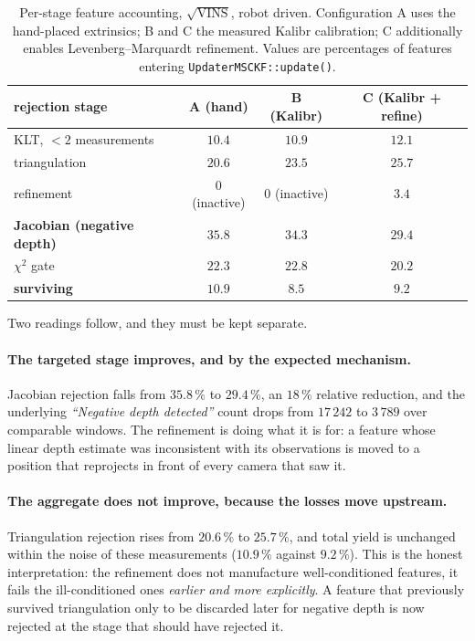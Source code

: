 \begin{table}[htbp]
\centering
\caption{Per-stage feature accounting, $\sqrt{\text{VINS}}$, robot driven.
Configuration A uses the hand-placed extrinsics; B and C the measured Kalibr
calibration; C additionally enables Levenberg--Marquardt refinement. Values
are percentages of features entering \texttt{UpdaterMSCKF::update()}.}
\label{tab:refine}
\begin{tabular}{lccc}
\hline
rejection stage & A (hand) & B (Kalibr) & C (Kalibr + refine) \\
\hline
KLT, $<2$ measurements & $10.4$ & $10.9$ & $12.1$ \\
triangulation          & $20.6$ & $23.5$ & $\mathbf{25.7}$ \\
refinement             & $0$ (inactive) & $0$ (inactive) & $3.4$ \\
\textbf{Jacobian (negative depth)} & $\mathbf{35.8}$ & $34.3$ & $\mathbf{29.4}$ \\
$\chi^{2}$ gate        & $22.3$ & $22.8$ & $20.2$ \\
\hline
\textbf{surviving}     & $10.9$ & $8.5$ & $9.2$ \\
\hline
\end{tabular}
\end{table}

Two readings follow, and they must be kept separate.

\paragraph{The targeted stage improves, and by the expected mechanism.}
Jacobian rejection falls from $35.8\,\%$ to $29.4\,\%$, an $18\,\%$ relative
reduction, and the underlying \emph{``Negative depth detected''} count drops
from $17\,242$ to $3\,789$ over comparable windows. The refinement is doing
what it is for: a feature whose linear depth estimate was inconsistent with
its observations is moved to a position that reprojects in front of every
camera that saw it.

\paragraph{The aggregate does not improve, because the losses move upstream.}
Triangulation rejection rises from $20.6\,\%$ to $25.7\,\%$, and total yield
is unchanged within the noise of these measurements ($10.9\,\%$ against
$9.2\,\%$). This is the honest interpretation: the refinement does not
manufacture well-conditioned features, it fails the ill-conditioned ones
\emph{earlier and more explicitly}. A feature that previously survived
triangulation only to be discarded later for negative depth is now rejected at
the stage that should have rejected it.

